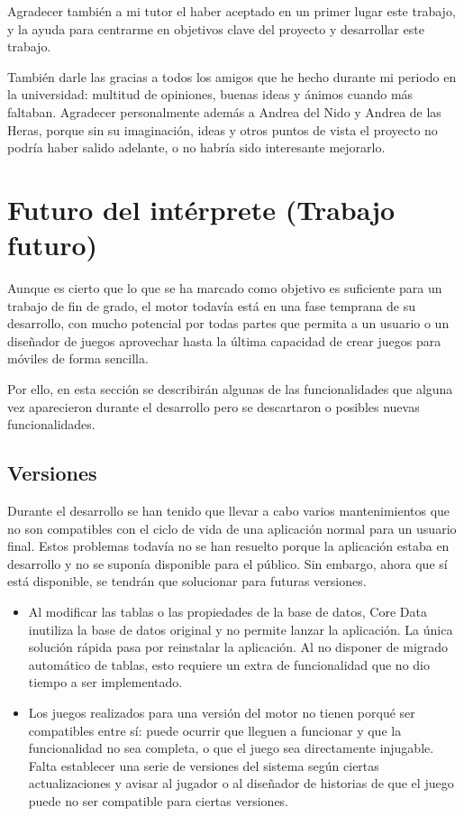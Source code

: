 Agradecer también a mi tutor el haber aceptado en un primer lugar este trabajo, y la ayuda para centrarme en objetivos clave del proyecto y desarrollar este trabajo.

También darle las gracias a todos los amigos que he hecho durante mi periodo en la universidad: multitud de opiniones, buenas ideas y ánimos cuando más faltaban. Agradecer personalmente además a Andrea del Nido y Andrea de las Heras, porque sin su imaginación, ideas y otros puntos de vista el proyecto no podría haber salido adelante, o no habría sido interesante mejorarlo.

\section{Futuro del intérprete (Trabajo futuro)}
Aunque es cierto que lo que se ha marcado como objetivo es suficiente para un trabajo de fin de grado, el motor todavía está en una fase temprana de su desarrollo, con mucho potencial por todas partes que permita a un usuario o un diseñador de juegos aprovechar hasta la última capacidad de crear juegos para móviles de forma sencilla.

Por ello, en esta sección se describirán algunas de las funcionalidades que alguna vez aparecieron durante el desarrollo pero se descartaron o posibles nuevas funcionalidades.

\subsection{Versiones}
Durante el desarrollo se han tenido que llevar a cabo varios mantenimientos que no son compatibles con el ciclo de vida de una aplicación normal para un usuario final. Estos problemas todavía no se han resuelto porque la aplicación estaba en desarrollo y no se suponía disponible para el público. Sin embargo, ahora que sí está disponible, se tendrán que solucionar para futuras versiones.

\begin{itemize}
	\item Al modificar las tablas o las propiedades de la base de datos, Core Data inutiliza la base de datos original y no permite lanzar la aplicación. La única solución rápida pasa por reinstalar la aplicación. Al no disponer de migrado automático de tablas, esto requiere un extra de funcionalidad que no dio tiempo a ser implementado. 
	\item Los juegos realizados para una versión del motor no tienen porqué ser compatibles entre sí: puede ocurrir que lleguen a funcionar y que la funcionalidad no sea completa, o que el juego sea directamente injugable. Falta establecer una serie de versiones del sistema según  ciertas actualizaciones y avisar al jugador o al diseñador de historias de que el juego puede no ser compatible para ciertas versiones.
\end{itemize}

